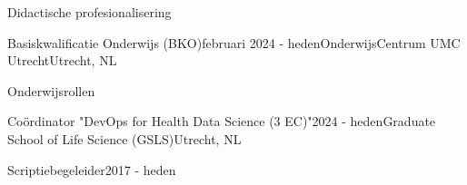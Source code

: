 \begin{rSection}{Didactische profesionalisering}
\begin{rSubsection}{Basiskwalificatie Onderwijs (BKO)}{februari 2024 - heden}{OnderwijsCentrum UMC Utrecht}{Utrecht, NL}
  \vspace{-1.5em}
\end{rSubsection}
\end{rSection}

\begin{rSection}{Onderwijsrollen}
\begin{rSubsection}{Co\"{o}rdinator "DevOps for Health Data Science (3 EC)"}{2024 - heden}{Graduate School of Life Science (GSLS)}{Utrecht, NL}
  \vspace{-1.5em}
\end{rSubsection}

\begin{rSubsection}{Scriptiebegeleider}{2017 - heden}{}{}
   \vspace{-1.5em}
      
\end{rSubsection}

\end{rSection}


